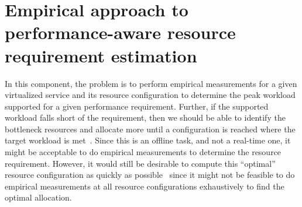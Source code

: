 
\section{Empirical approach to performance-aware resource requirement 
estimation}

In this component, the problem is to perform empirical measurements
for a given virtualized service and its resource configuration to
determine the peak workload supported for a given performance
requirement. Further, if the supported workload falls short of the
requirement, then we should be able to identify the
bottleneck resources and allocate more until a configuration is
reached where the target workload is met~\cite{sandpiper}.
Since this is an offline task,
and not a real-time one, it might be acceptable to do empirical
measurements to determine
the resource requirement. However, it would still be
desirable to compute this ``optimal'' resource configuration
as quickly as possible~\cite{cutting-corners} since it might not be feasible to
do empirical measurements at all resource configurations exhaustively
to find the optimal allocation.


